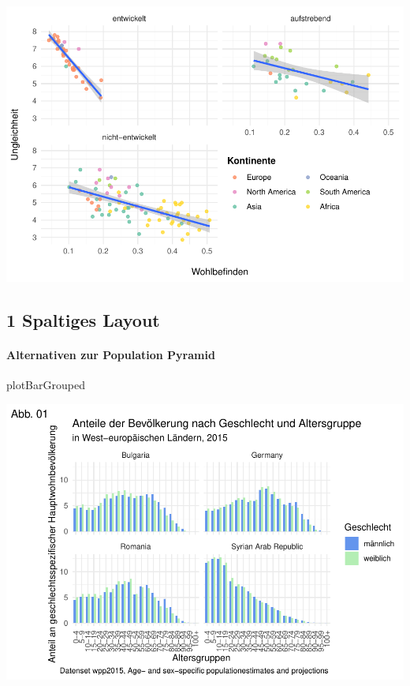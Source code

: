 \documentclass[
]{article}
\newenvironment{Shaded}{\begin{snugshade}}{\end{snugshade}}
\newcommand{\NormalTok}[1]{#1}
\let\oldparagraph\paragraph
\renewcommand{\paragraph}[1]{\oldparagraph{#1}\mbox{}}
\begin{document}
\includegraphics{ggplot2_files/figure-latex/unnamed-chunk-11-1.pdf}

\hypertarget{spaltiges-layout}{%
\subsection{1 Spaltiges Layout}\label{spaltiges-layout}}

\hypertarget{alternativen-zur-population-pyramid}{%
\paragraph{Alternativen zur Population
Pyramid}\label{alternativen-zur-population-pyramid}}

\begin{Shaded}
\begin{Highlighting}[]
\NormalTok{plotBarGrouped}
\end{Highlighting}
\end{Shaded}

\includegraphics{ggplot2_files/figure-latex/unnamed-chunk-12-1.pdf}
\end{document}
